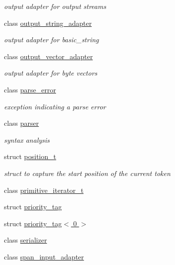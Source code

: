 \begin{DoxyCompactItemize}
\begin{DoxyCompactList}\small\item\em output adapter for output streams \end{DoxyCompactList}\item 
class \hyperlink{classnlohmann_1_1detail_1_1output__string__adapter}{output\+\_\+string\+\_\+adapter}
\begin{DoxyCompactList}\small\item\em output adapter for basic\+\_\+string \end{DoxyCompactList}\item 
class \hyperlink{classnlohmann_1_1detail_1_1output__vector__adapter}{output\+\_\+vector\+\_\+adapter}
\begin{DoxyCompactList}\small\item\em output adapter for byte vectors \end{DoxyCompactList}\item 
class \hyperlink{classnlohmann_1_1detail_1_1parse__error}{parse\+\_\+error}
\begin{DoxyCompactList}\small\item\em exception indicating a parse error \end{DoxyCompactList}\item 
class \hyperlink{classnlohmann_1_1detail_1_1parser}{parser}
\begin{DoxyCompactList}\small\item\em syntax analysis \end{DoxyCompactList}\item 
struct \hyperlink{structnlohmann_1_1detail_1_1position__t}{position\+\_\+t}
\begin{DoxyCompactList}\small\item\em struct to capture the start position of the current token \end{DoxyCompactList}\item 
class \hyperlink{classnlohmann_1_1detail_1_1primitive__iterator__t}{primitive\+\_\+iterator\+\_\+t}
\item 
struct \hyperlink{structnlohmann_1_1detail_1_1priority__tag}{priority\+\_\+tag}
\item 
struct \hyperlink{structnlohmann_1_1detail_1_1priority__tag_3_010_01_4}{priority\+\_\+tag$<$ 0 $>$}
\item 
class \hyperlink{classnlohmann_1_1detail_1_1serializer}{serializer}
\item 
class \hyperlink{classnlohmann_1_1detail_1_1span__input__adapter}{span\+\_\+input\+\_\+adapter}

\end{DoxyCompactItemize}
